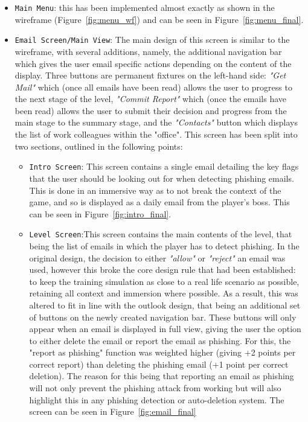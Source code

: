 \documentclass{l4proj}
\begin{document}
\begin{itemize}
  \item \verb|Main Menu|: this has been implemented almost exactly as shown in the wireframe (Figure~\ref{fig:menu_wf}) and can be seen in Figure~\ref{fig:menu_final}.
  \item \verb|Email Screen/Main View|: The main design of this screen is similar to the wireframe, with several additions, namely, the additional navigation bar which gives the user email specific actions depending on the content of the display. Three buttons are permanent fixtures on the left-hand side: \textit{"Get Mail"} which (once all emails have been read) allows the user to progress to the next stage of the level, \textit{"Commit Report"} which (once the emails have been read) allows the user to submit their decision and progress from the main stage to the summary stage, and the \textit{"Contacts"} button which displays the list of work colleagues within the "office". This screen has been split into two sections, outlined in the following points:
    \begin{itemize}
        \item \verb|Intro Screen|: This screen contains a single email detailing the key flags that the user should be looking out for when detecting phishing emails. This is done in an immersive way as to not break the context of the game, and so is displayed as a daily email from the player's boss. This can be seen in Figure~\ref{fig:intro_final}.
        \item \verb|Level Screen|:This screen contains the main contents of the level, that being the list of emails in which the player has to detect phishing. In the original design, the decision to either \textit{"allow"} or \textit{"reject"} an email was used, however this broke the core design rule that had been established: to keep the training simulation as close to a real life scenario as possible, retaining all context and immersion where possible. As a result, this was altered to fit in line with the outlook design, that being an additional set of buttons on the newly created navigation bar. These buttons will only appear when an email is displayed in full view, giving the user the option to either delete the email or report the email as phishing. For this, the "report as phishing" function was weighted higher (giving +2 points per correct report) than deleting the phishing email (+1 point per correct deletion). The reason for this being that reporting an email as phishing will not only prevent the phishing attack from working but will also highlight this in any phishing detection or auto-deletion system. The screen can be seen in Figure~\ref{fig:email_final}

\end{itemize}
\end{itemize}
\end{document}
